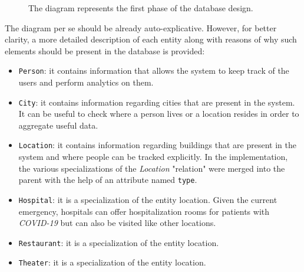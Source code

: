 \documentclass[12pt, a4paper]{article}
\begin{document}
\begin{figure}[h]
    \caption*{The diagram represents the first phase of the database design.} %
\end{figure}

\noindent %
The diagram per se should be already auto-explicative. However, for better 
clarity, a more detailed description of each entity along with reasons of why 
such elements should be present in the database is provided:

\begin{itemize}
    \item \texttt{Person}: it contains information that allows the system to
        keep track of the users and perform analytics on them.  
    \item \texttt{City}: it contains information regarding cities that are
        present in the system. It can be useful to check where a person lives
        or a location resides in order to aggregate useful data.
    \item \texttt{Location}: it contains information regarding buildings that 
        are present in the system and where people can be tracked explicitly. 
        In the implementation, the various specializations of the 
        \emph{Location} "relation" were merged into the parent with the help
        of an attribute named \texttt{type}.
    \item \texttt{Hospital}: it is a specialization of the entity location. 
        Given the current emergency, hospitals can offer hospitalization rooms 
        for patients with \emph{COVID-19} but can also be visited like other 
        locations. 
    \item \texttt{Restaurant}: it is a specialization of the entity location. 
    \item \texttt{Theater}: it is a specialization of the entity location.  
\end{itemize}
\end{document}
